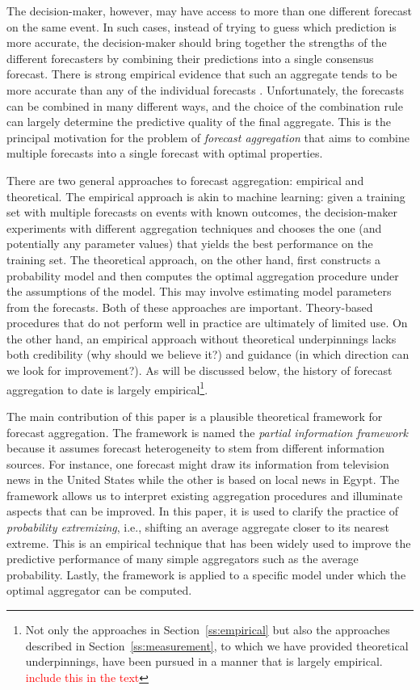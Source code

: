 \documentclass[12pt]{article}
\theoremstyle{definition}
\theoremstyle{definition}
\begin{document}
The decision-maker, however, may have access to more than one different forecast on the same event. In such cases, instead of trying to guess which prediction is more accurate, the decision-maker should bring together the strengths of the different forecasters by combining their predictions into a single consensus forecast. There is strong empirical evidence that such an aggregate tends to be more accurate than any of the individual forecasts \citep{armstrong2001combining}. Unfortunately, the forecasts can be combined in many different ways, and the choice of the combination
rule can largely determine the predictive quality of the final
aggregate.  
This is the principal motivation for the problem of  \textit{forecast aggregation} that aims to combine multiple forecasts into a single
forecast with optimal properties.

There are two general approaches to forecast aggregation: empirical
and theoretical.  The empirical approach is akin to machine
learning: given a training set with multiple forecasts on events with
known outcomes, the decision-maker experiments with different
aggregation techniques and chooses the one (and potentially any
parameter values) that yields the best performance on the training set.
The theoretical approach, on the other hand, first constructs a
probability model and then computes the optimal aggregation procedure
under the assumptions of the model.  This may involve estimating model
parameters from the forecasts. Both of these approaches are important.  Theory-based procedures that do not
perform well in practice are ultimately of limited use.  On the other
hand, an empirical approach without theoretical underpinnings lacks
both credibility (why should we believe it?)  and guidance (in which
direction can we look for improvement?). As will be discussed below, the history of forecast aggregation to date is largely
empirical\footnote{Not only the approaches in
Section~\ref{ss:empirical} but also the approaches described in
Section~\ref{ss:measurement}, to which we have provided theoretical
underpinnings, have been pursued in a manner that is largely
empirical. \textcolor{red}{include this in the text}}. 

The main contribution of this paper is a plausible
theoretical framework for forecast aggregation. The framework is named the \textit{partial information framework} because it assumes forecast heterogeneity to stem from different information sources. For instance, one forecast might draw its information from television news in the United States
while the other is based on local news in Egypt.
 The framework allows
us to interpret existing aggregation procedures and illuminate aspects
that can be improved. In this paper, it is used to clarify the practice of {\em probability
extremizing}, i.e., shifting an average aggregate closer to its nearest
extreme. This is an empirical technique that has been widely used to
improve the predictive performance of many simple aggregators such as
the average probability. Lastly, the framework is applied to a
specific model under which the optimal aggregator can be computed.
\end{document}
